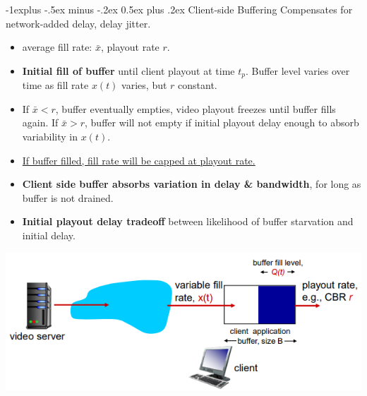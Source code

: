 \documentclass[12pt, landscape]{article}
\makeatletter
\renewcommand{\subsection}{\@startsection{subsection}{2}{0.1mm}%
                                {-1explus -.5ex minus -.2ex}%
                                {0.5ex plus .2ex}%
                                {\normalfont\normalsize\bfseries}}
\makeatother
\begin{document}
\begin{multicols*}{3}
\subsection{Client-side Buffering}
Compensates for network-added delay, delay jitter.
\begin{itemize}
\item average fill rate: $\bar{x}$, playout rate $r$.
\item \textbf{Initial fill of buffer} until client playout at time $t_p$. Buffer level varies over time as fill rate $x(t)$ varies, but $r$ constant.
\item If $\bar{x} < r$, buffer eventually empties, video playout freezes until buffer fills again. If $\bar{x} > r$, buffer will not empty if initial playout delay enough to absorb variability in $x(t)$.
\item \underline{If buffer filled, fill rate will be capped at playout rate.}
\item \textbf{Client side buffer absorbs variation in delay \& bandwidth}, for long as buffer is not drained.
\item \textbf{Initial playout delay tradeoff} between likelihood of buffer starvation and initial delay.
\end{itemize}
\centerline{\includegraphics[width=0.75\linewidth]{clientbuffer}}


\end{multicols*}
\end{document}
